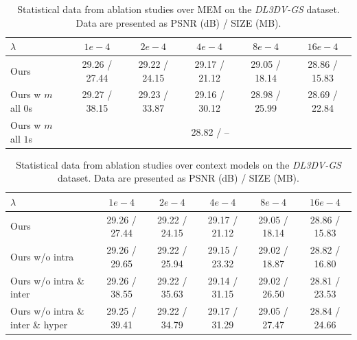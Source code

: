 \documentclass{article} %
\begin{document}
\begin{table}[H]
    \centering
    \vspace{-5pt}
    \caption{Statistical data from ablation studies over MEM on the \textit{DL3DV-GS} dataset. Data are presented as PSNR (dB) / SIZE (MB).}
    \vspace{5pt}
    \renewcommand{\arraystretch}{1.20}
    \begin{tabular}{l|ccccc}
        \toprule[2pt]
        $\lambda$                        & $1e-4$  & $2e-4$  & $4e-4$  & $8e-4$  & $16e-4$ \\ \bottomrule
        Ours                             & 29.26 / 27.44 & 29.22 / 24.15 & 29.17 / 21.12 & 29.05 / 18.14 & 28.86 / 15.83 \\
        Ours w $m$ all $0$s              & 29.27 / 38.15 & 29.23 / 33.87 & 29.16 / 30.12 & 28.98 / 25.99 & 28.69 / 22.84 \\
        Ours w $m$ all $1$s              & \multicolumn{5}{c}{28.82 / --} \\ \bottomrule[2pt]
    \end{tabular}
    \label{tab:statistic_MEM}
\end{table}


\begin{table}[H]
    \centering
    \small
    \vspace{-5pt}
    \caption{Statistical data from ablation studies over context models on the \textit{DL3DV-GS} dataset. Data are presented as PSNR (dB) / SIZE (MB).}
    \vspace{5pt}
    \renewcommand{\arraystretch}{1.20}
    \begin{tabular}{l|ccccc}
        \toprule[2pt]
        $\lambda$                        & $1e-4$  & $2e-4$  & $4e-4$  & $8e-4$  & $16e-4$ \\ \bottomrule
        Ours                             & 29.26 / 27.44 & 29.22 / 24.15 & 29.17 / 21.12 & 29.05 / 18.14 & 28.86 / 15.83 \\
        Ours w/o intra                   & 29.26 / 29.65 & 29.22 / 25.94 & 29.15 / 23.32 & 29.02 / 18.87 & 28.82 / 16.80 \\
        Ours w/o intra \& inter          & 29.26 / 38.55 & 29.22 / 35.63 & 29.14 / 31.15 & 29.02 / 26.50 & 28.81 / 23.53 \\
        Ours w/o intra \& inter \& hyper & 29.25 / 39.41 & 29.22 / 34.79 & 29.17 / 31.29 & 29.05 / 27.47 & 28.84 / 24.66 \\ \bottomrule[2pt]
    \end{tabular}
    \label{tab:statistic_context}
\end{table}
\end{document}
